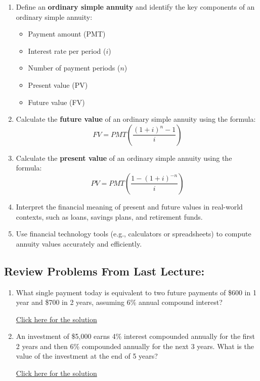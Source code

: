 \documentclass[
]{book}
\providecommand{\tightlist}{%
  \setlength{\itemsep}{0pt}\setlength{\parskip}{0pt}}
\begin{document}
\begin{enumerate}
\def\labelenumi{\arabic{enumi}.}
\tightlist
\item
  Define an \textbf{ordinary simple annuity} and identify the key components of an ordinary simple annuity:

  \begin{itemize}
  \tightlist
  \item
    Payment amount (PMT)
  \item
    Interest rate per period (\(i\))
  \item
    Number of payment periods (\(n\))
  \item
    Present value (PV)
  \item
    Future value (FV)
  \end{itemize}
\item
  Calculate the \textbf{future value} of an ordinary simple annuity using the formula:
  \[
   FV = PMT \left( \frac{(1 + i)^n - 1}{i} \right)
   \]
\item
  Calculate the \textbf{present value} of an ordinary simple annuity using the formula:
  \[
   PV = PMT \left( \frac{1 - (1 + i)^{-n}}{i} \right)
   \]
\item
  Interpret the financial meaning of present and future values in real-world contexts, such as loans, savings plans, and retirement funds.
\item
  Use financial technology tools (e.g., calculators or spreadsheets) to compute annuity values accurately and efficiently.
\end{enumerate}

\subsection*{Review Problems From Last Lecture:}\label{review-problems-from-last-lecture-11}

\begin{enumerate}
\def\labelenumi{\arabic{enumi}.}
\tightlist
\item
  What single payment today is equivalent to two future payments of \$600 in 1 year and \$700 in 2 years, assuming 6\% annual compound interest?

  \href{https://youtu.be/heaWuNOF9Wk}{Click here for the solution}
\item
  An investment of \$5,000 earns 4\% interest compounded annually for the first 2 years and then 6\% compounded annually for the next 3 years. What is the value of the investment at the end of 5 years?

  \href{https://youtu.be/urUERAWX47I}{Click here for the solution}
\end{enumerate}
\end{document}
